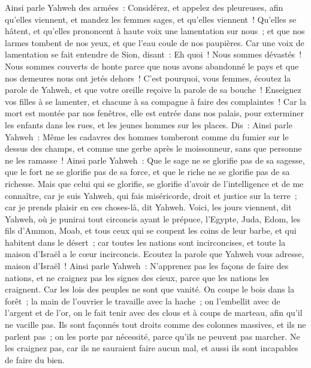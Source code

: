 \begin{multicols}{2}
Ainsi parle Yahweh des armées~: Considérez, et appelez des pleureuses, afin qu'elles viennent, et mandez les femmes sages, et qu'elles viennent~!
Qu'elles se hâtent, et qu'elles prononcent à haute voix une lamentation sur nous~; et que nos larmes tombent de nos yeux, et que l'eau coule de nos paupières.
Car une voix de lamentation se fait entendre de Sion, disant~: Eh quoi~! Nous sommes dévastés~! Nous sommes couverts de honte parce que nous avons abandonné le pays et que nos demeures nous ont jetés dehors~!
C'est pourquoi, vous femmes, écoutez la parole de Yahweh, et que votre oreille reçoive la parole de sa bouche~! Enseignez vos filles à se lamenter, et chacune à sa compagne à faire des complaintes~!
Car la mort est montée par nos fenêtres, elle est entrée dans nos palais, pour exterminer les enfants dans les rues, et les jeunes hommes sur les places.
Dis~: Ainsi parle Yahweh~: Même les cadavres des hommes tomberont comme du fumier sur le dessus des champs, et comme une gerbe après le moissonneur, sans que personne ne les ramasse~!
Ainsi parle Yahweh~: Que le sage ne se glorifie pas de sa sagesse, que le fort ne se glorifie pas de sa force, et que le riche ne se glorifie pas de sa richesse.
Mais que celui qui se glorifie, se glorifie d'avoir de l'intelligence et de me connaître, car je suis Yahweh, qui fais miséricorde, droit et justice sur la terre~; car je prends plaisir en ces choses-là, dit Yahweh.
Voici, les jours viennent, dit Yahweh, où je punirai tout circoncis ayant le prépuce,
l'Egypte, Juda, Edom, les fils d'Ammon, Moab, et tous ceux qui se coupent les coins de leur barbe, et qui habitent dans le désert~; car toutes les nations sont incirconcises, et toute la maison d'Israël a le cœur incirconcis.
\VerseOne{}Ecoutez la parole que Yahweh vous adresse, maison d'Israël~!
Ainsi parle Yahweh~: N'apprenez pas les façons de faire des nations, et ne craignez pas les signes des cieux, parce que les nations les craignent.
Car les lois des peuples ne sont que vanité. On coupe le bois dans la forêt~; la main de l'ouvrier le travaille avec la hache~;
on l'embellit avec de l'argent et de l'or, on le fait tenir avec des clous et à coups de marteau, afin qu'il ne vacille pas.
Ils sont façonnés tout droits comme des colonnes massives, et ils ne parlent pas~; on les porte par nécessité, parce qu'ils ne peuvent pas marcher. Ne les craignez pas, car ils ne sauraient faire aucun mal, et aussi ils sont incapables de faire du bien.

\end{multicols}
